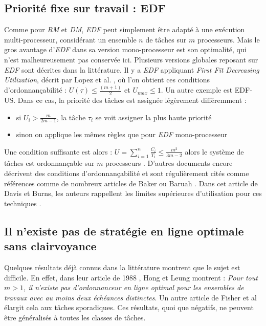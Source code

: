 \documentclass[11pt,a4paper,oneside]{report}
\begin{document}
	\subsection{Priorité fixe sur travail : EDF}
	Comme pour \textit{RM} et \textit{DM}, \textit{EDF} peut simplement être adapté à une exécution multi-processeur, 
	considérant un ensemble $n$ de tâches sur $m$ processeurs. Mais le gros avantage d'\textit{EDF} 
	dans sa version mono-processeur est son optimalité, qui n'est malheureusement pas conservée ici. 
	Plusieurs versions globales reposant sur \textit{EDF} sont décrites dans la littérature. 
	Il y a \textit{EDF} appliquant \textit{First Fit Decreasing Utilization}, décrit par 
	Lopez et al. \cite{lopez_utilization_2004}, où l'on obtient ces conditions d'ordonnançabilité : \medskip
	$U(\tau) \leq \frac{(m + 1)}{2}$ et $U_{max} \leq 1$. \medskip
	Un autre exemple est EDF-US. 
	Dans ce cas, la priorité des tâches est assignée légèrement différemment :\medskip
	\begin{itemize}
		\item si $U_i > \frac{m}{2m-1}$, la tâche $\tau_i$ se voit assigner la plus haute priorité
		\item sinon on applique les mêmes règles que pour \textit{EDF} mono-processeur
	\end{itemize}
	Une condition suffisante est alors :\medskip
	$U = \sum_{i=1}^{n}\frac{C_i}{T_i} \leq \frac{m^2}{3m-2}$
	alors le système de tâches est ordonnançable sur $m$ processeurs
	\cite{andersson_static-priority_2001}. \medskip
	D'autres documents encore décrivent des conditions d'ordonnançabilité et sont régulièrement 
	cités comme références comme de nombreux articles de Baker 
	\cite{baker_multiprocessor_2003} \cite{baker_analysis_2005} ou Baruah \cite{baruah_optimal_2004}
	\cite{baruah_schedulability_2008}. 
	Dans cet article de Davis et Burns, les auteurs rappellent les 
	limites supérieures d'utilisation pour ces techniques \cite{davis_survey_2011}.\medskip
	
	
	\subsection{Il n'existe pas de stratégie en ligne optimale sans clairvoyance}
	Quelques résultats déjà connus dans la littérature montrent que le sujet est difficile. 
	En effet, dans leur article de 1988 \cite{hong_-line_1988}, Hong et Leung montrent :\medskip
	\textit{\og Pour tout $m > 1$, il n'existe pas d'ordonnanceur en ligne optimal pour les ensembles 
	de travaux avec au moins deux échéances distinctes\fg{}}. 
	Un autre article de Fisher et al \cite{fisher_optimal_2010} élargit cela aux tâches sporadiques. 
	Ces résultats, quoi que négatifs, ne peuvent être généralisés à toutes les classes de tâches. 
	
\end{document}
